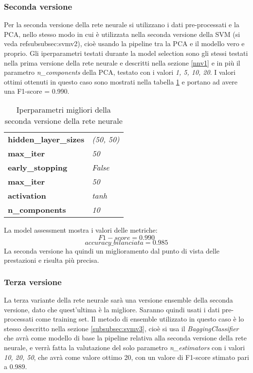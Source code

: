 \subsubsection{Seconda versione}\label{nnv2}
Per la seconda versione della rete neurale si utilizzano i dati pre-processati e la PCA, nello stesso modo in cui è utilizzata nella seconda versione della SVM (si veda ref{subsubsec:svmv2}), cioè usando la pipeline tra la PCA e il modello vero e proprio.  Gli iperparametri testati durante la model selection sono gli stessi testati nella prima versione della rete neurale e descritti nella sezione \ref{nnv1} e in più il parametro \textit{n\_components} della PCA, testato con i valori \textit{1, 5, 10, 20}. I valori ottimi ottenuti in questo caso sono mostrati nella tabella \ref{tab:nnv2} e portano ad avere una F1-score = 0.990.

\begin{table}[h] 
\centering
\begin{tabular}{l l}
\hline
\textbf{hidden\_layer\_sizes} & \textit{(50, 50)}\\
\textbf{max\_iter} & \textit{50}\\
\textbf{early\_stopping} & \textit{False}\\
\textbf{max\_iter} & \textit{50}\\
\textbf{activation} & \textit{tanh}\\
\textbf{n\_components} & \textit{10}\\
\hline
\end{tabular}
\caption{Iperparametri migliori della seconda versione della rete neurale}
\label{tab:nnv2}
\end{table}

La model assessment mostra i valori delle metriche:
$$F1-score = 0.990$$
$$accuracy\_bilanciata = 0.985$$
La seconda versione ha quindi un miglioramento dal punto di vista delle prestazioni e risulta più precisa.

\subsubsection{Terza versione}\label{nnv3}
La terza variante della rete neurale sarà una versione ensemble della seconda versione, dato che quest'ultima è la migliore. Saranno quindi usati i dati pre-processati come training set. Il metodo di ensemble utilizzato in questo caso è lo stesso descritto nella sezione \ref{subsubsec:svmv3}, cioè si usa il \textit{BaggingClassifier} che avrà come modello di base la pipeline relativa alla seconda versione della rete neurale, e verrà fatta la valutazione del solo parametro \textit{n\_estimators} con i valori \textit{10, 20, 50}, che avrà come valore ottimo 20, con un valore di F1-score stimato pari a 0.989.

